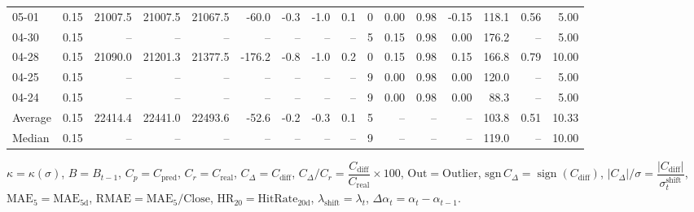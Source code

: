 \begin{threeparttable}
{\begin{tabular}{lrrrrrrrrrrrrrrr}
  05-01 &     0.15 & 21007.5 & 21007.5 & 21067.5 &      -60.0 &           -0.3 &                     -1.0 &                 0.1 &              0 &       0.00 &      0.98 &          -0.15 &            118.1 &            0.56 &                   5.00 \\
  04-30 &     0.15 &      -- &      -- &      -- &         -- &             -- &                       -- &                  -- &              5 &       0.15 &      0.98 &           0.00 &            176.2 &              -- &                   5.00 \\
  04-28 &     0.15 & 21090.0 & 21201.3 & 21377.5 &     -176.2 &           -0.8 &                     -1.0 &                 0.2 &              0 &       0.15 &      0.98 &           0.15 &            166.8 &            0.79 &                  10.00 \\
  04-25 &     0.15 &      -- &      -- &      -- &         -- &             -- &                       -- &                  -- &              9 &       0.00 &      0.98 &           0.00 &            120.0 &              -- &                   5.00 \\
  04-24 &     0.15 &      -- &      -- &      -- &         -- &             -- &                       -- &                  -- &              9 &       0.00 &      0.98 &           0.00 &             88.3 &              -- &                   5.00 \\
Average &     0.15 & 22414.4 & 22441.0 & 22493.6 &      -52.6 &           -0.2 &                     -0.3 &                 0.1 &              5 &         -- &        -- &             -- &            103.8 &            0.51 &                  10.33 \\
 Median &     0.15 &      -- &      -- &      -- &         -- &             -- &                       -- &                  -- &              9 &         -- &        -- &             -- &            119.0 &              -- &                  10.00 \\
\bottomrule
\end{tabular}
}
\begin{tablenotes}\footnotesize
\item $\kappa=\kappa(\sigma)$, $B=B_{t-1}$, $C_p=C_{\text{pred}}$, $C_r=C_{\text{real}}$, $C_\Delta=C_{\text{diff}}$, $C_\Delta/C_r=\dfrac{C_{\text{diff}}}{C_{\text{real}}}\times100$, $\mathrm{Out}=\text{Outlier}$, $\mathrm{sgn}\,C_\Delta=\operatorname{sign}(C_{\text{diff}})$, $|C_\Delta|/\sigma=\dfrac{|C_{\text{diff}}|}{\sigma_t^{\text{shift}}}$, $\mathrm{MAE}_5=\mathrm{MAE}_{5\text{d}}$, $\mathrm{RMAE}= \mathrm{MAE}_5 / \text{Close}$, $\mathrm{HR}_{20}=\mathrm{HitRate}_{20\text{d}}$, 
$\lambda_{\text{shift}}=\lambda_t$, 
$\Delta\alpha_t=\alpha_t-\alpha_{t-1}$.
\end{tablenotes}
\end{threeparttable}
\endgroup

